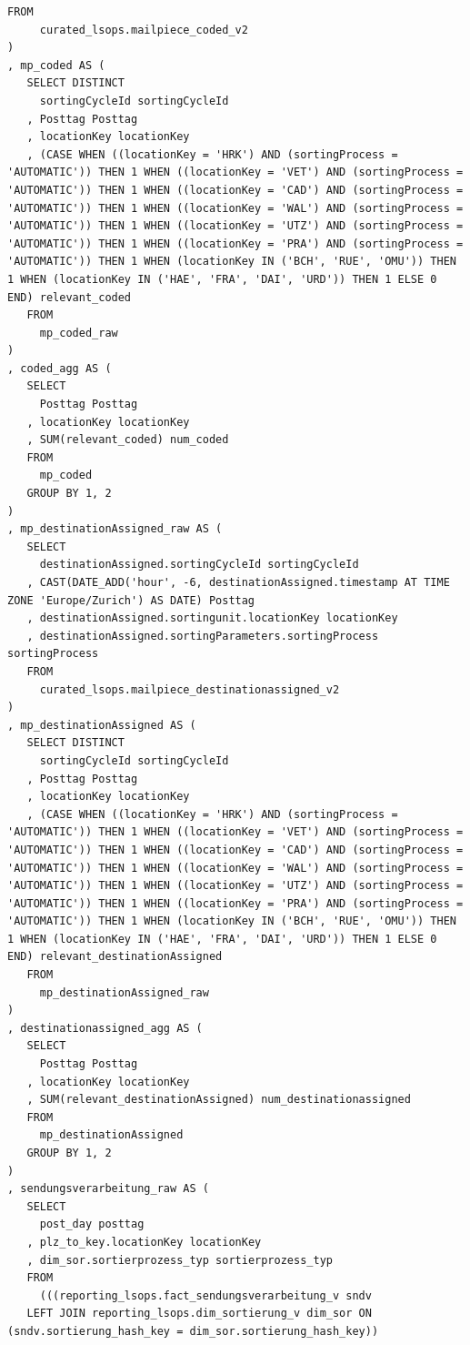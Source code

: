 \begin{lstlisting}[style=sqlstyle]
   FROM
     curated_lsops.mailpiece_coded_v2
) 
, mp_coded AS (
   SELECT DISTINCT
     sortingCycleId sortingCycleId
   , Posttag Posttag
   , locationKey locationKey
   , (CASE WHEN ((locationKey = 'HRK') AND (sortingProcess = 'AUTOMATIC')) THEN 1 WHEN ((locationKey = 'VET') AND (sortingProcess = 'AUTOMATIC')) THEN 1 WHEN ((locationKey = 'CAD') AND (sortingProcess = 'AUTOMATIC')) THEN 1 WHEN ((locationKey = 'WAL') AND (sortingProcess = 'AUTOMATIC')) THEN 1 WHEN ((locationKey = 'UTZ') AND (sortingProcess = 'AUTOMATIC')) THEN 1 WHEN ((locationKey = 'PRA') AND (sortingProcess = 'AUTOMATIC')) THEN 1 WHEN (locationKey IN ('BCH', 'RUE', 'OMU')) THEN 1 WHEN (locationKey IN ('HAE', 'FRA', 'DAI', 'URD')) THEN 1 ELSE 0 END) relevant_coded
   FROM
     mp_coded_raw
) 
, coded_agg AS (
   SELECT
     Posttag Posttag
   , locationKey locationKey
   , SUM(relevant_coded) num_coded
   FROM
     mp_coded
   GROUP BY 1, 2
) 
, mp_destinationAssigned_raw AS (
   SELECT
     destinationAssigned.sortingCycleId sortingCycleId
   , CAST(DATE_ADD('hour', -6, destinationAssigned.timestamp AT TIME ZONE 'Europe/Zurich') AS DATE) Posttag
   , destinationAssigned.sortingunit.locationKey locationKey
   , destinationAssigned.sortingParameters.sortingProcess sortingProcess
   FROM
     curated_lsops.mailpiece_destinationassigned_v2
) 
, mp_destinationAssigned AS (
   SELECT DISTINCT
     sortingCycleId sortingCycleId
   , Posttag Posttag
   , locationKey locationKey
   , (CASE WHEN ((locationKey = 'HRK') AND (sortingProcess = 'AUTOMATIC')) THEN 1 WHEN ((locationKey = 'VET') AND (sortingProcess = 'AUTOMATIC')) THEN 1 WHEN ((locationKey = 'CAD') AND (sortingProcess = 'AUTOMATIC')) THEN 1 WHEN ((locationKey = 'WAL') AND (sortingProcess = 'AUTOMATIC')) THEN 1 WHEN ((locationKey = 'UTZ') AND (sortingProcess = 'AUTOMATIC')) THEN 1 WHEN ((locationKey = 'PRA') AND (sortingProcess = 'AUTOMATIC')) THEN 1 WHEN (locationKey IN ('BCH', 'RUE', 'OMU')) THEN 1 WHEN (locationKey IN ('HAE', 'FRA', 'DAI', 'URD')) THEN 1 ELSE 0 END) relevant_destinationAssigned
   FROM
     mp_destinationAssigned_raw
) 
, destinationassigned_agg AS (
   SELECT
     Posttag Posttag
   , locationKey locationKey
   , SUM(relevant_destinationAssigned) num_destinationassigned
   FROM
     mp_destinationAssigned
   GROUP BY 1, 2
) 
, sendungsverarbeitung_raw AS (
   SELECT
     post_day posttag
   , plz_to_key.locationKey locationKey
   , dim_sor.sortierprozess_typ sortierprozess_typ
   FROM
     (((reporting_lsops.fact_sendungsverarbeitung_v sndv
   LEFT JOIN reporting_lsops.dim_sortierung_v dim_sor ON (sndv.sortierung_hash_key = dim_sor.sortierung_hash_key))

\end{lstlisting}
